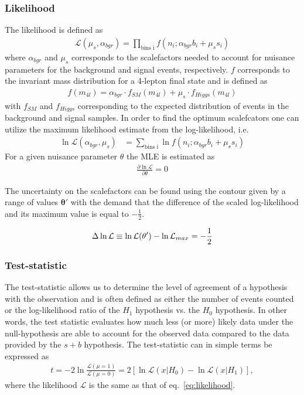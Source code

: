 \documentclass[12pt,a4paper]{amsart}
\begin{document}
\subsubsection{Likelihood} \label{susubsec:Theory-p-values_and_significance-likelihood}
The likelihood is defined as
\begin{align}
\mathcal{L}(\mu_s, \alpha_{bgr}) = \prod_{\text{bins i}}f(n_i; \alpha_{bgr}b_i + \mu_{s}s_i) \label{eq:likelihood}
\end{align}
where $\alpha_{bgr}$ and $\mu_s$ corresponds to the scalefactors needed to account for nuisance parameters for the background and signal events, respectively. $f$ corresponds to the invariant mass distribution for a 4-lepton final state and is defined as
\begin{align}
f(m_{4l}) = \alpha_{bgr} \cdot f_{SM}(m_{4l}) + \mu_s\cdot f_{Higgs}(m_{4l}) \label{eq:invariant_mass_dist_m_4l}
\end{align}
with $f_{SM}$ and $f_{Higgs}$ corresponding to the expected distribution of events in the background and signal samples. In order to find the optimum scalefcators one can utilize the maximum likelihood estimate from the log-likelihood, i.e.
\begin{align}
\ln \mathcal{L}(\alpha_{bgr}, \mu_s) &= \sum_{\text{bins i}}\ln f(n_i; \alpha_{bgr}b_i + \mu_{s}s_i) \label{eq:logL}
\end{align}
For a given nuisance parameter $\theta$ the MLE is estimated as
\begin{align}
\frac{\partial \ln \mathcal{L}}{\partial \theta} = 0 \label{eq:MLE}
\end{align}

The uncertainty on the scalefactors can be found using the contour given by a range of values $\mathbf{ \theta}'$ with the demand that the difference of the scaled log-likelihood and its maximum value is equal to $-\frac{1}{2}$.

\begin{align}
\Delta \ln \mathcal{L} \equiv \ln \mathcal{L}(\bold{\theta}') - \ln \mathcal{L}_{max} = -\frac{1}{2}
\end{align}

\subsubsection{Test-statistic} \label{subsubsec:Theory-(p-values and significance)-(test-statistic)}
The test-statistic allows us to determine the level of agreement of a hypothesis with the observation and is often defined as either the number of events counted or the log-likelihood ratio of the $H_1$ hypothesis vs. the $H_0$ hypothesis. In other words, the test statistic evaluates how much less (or more) likely data under the null-hypothesis are able to account for the observed data compared to the data provided by the $s+b$ hypothesis. The test-statistic can in simple terms be expressed as
\begin{align}
t = -2\ln\frac{\mathcal{L}(\mu=1)}{\mathcal{L}(\mu=0)} = 2[\ln\mathcal{L}(x|H_0) - \ln\mathcal{L}(x|H_1)] \label{eq:test_statistic},
\end{align}
where the likelihood $\mathcal{L}$ is the same as that of eq.~\eqref{eq:likelihood}.
\end{document}
